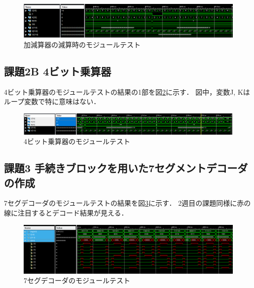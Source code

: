 \begin{figure}[tbp]
  \includegraphics[angle=0,width=160mm]{week3/pics/addersub-sub-sim.png}
  \centering
  \caption{加減算器の減算時のモジュールテスト} %
  \label{fig:addersub-sub-sim} %
\end{figure}


\subsection{課題2B 4ビット乗算器}
4ビット乗算器のモジュールテストの結果の1部を図\ref{fig:handmade-mul-sim}に示す．
図中，変数J, Kはループ変数で特に意味はない．

\begin{figure}[tbp]
  \includegraphics[angle=0,width=160mm]{week3/pics/multi-unsigned-handmade-sim.png}
  \centering
  \caption{4ビット乗算器のモジュールテスト} %
  \label{fig:handmade-mul-sim} %
\end{figure}

\subsection{課題3 手続きブロックを用いた7セグメントデコーダの作成}
7セグデコーダのモジュールテストの結果を図\ref{fig:decode7seg-block}に示す．
2週目の課題同様に赤の線に注目するとデコード結果が見える．
\begin{figure}[tbp]
  \includegraphics[angle=0,width=160mm]{week3/pics/7seg-dec-sim.png}
  \centering
  \caption{7セグデコーダのモジュールテスト} %
  \label{fig:decode7seg-block} %
\end{figure}


